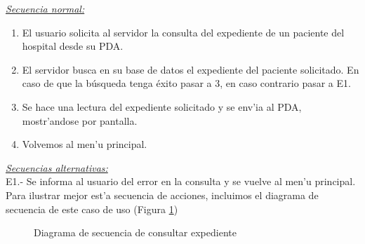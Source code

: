 \emph{\underline{Secuencia normal:}}
\begin{enumerate}
	\item El usuario solicita al servidor la consulta del expediente de un paciente del hospital desde su PDA.
	\item El servidor busca en su base de datos el expediente del paciente solicitado. En caso de que la b\'usqueda tenga \'exito pasar a 3, en caso contrario pasar a E1.
	\item Se hace una lectura del expediente solicitado y se env'ia al PDA, mostr'andose por pantalla.
	\item Volvemos al men'u principal.
\end{enumerate}

\emph{\underline{Secuencias alternativas:}}\bigskip \\ E1.- Se informa al usuario del error en la consulta y se vuelve al men'u principal.\bigskip \\ Para ilustrar mejor est'a secuencia de acciones, incluimos el diagrama de secuencia de este caso de uso (Figura \ref{fig:consulta_expediente})

\begin{figure}[h!]
	\begin{center}
     	\end{center}
    	\caption{Diagrama de secuencia de consultar expediente}\label{fig:consulta_expediente}
\end{figure}